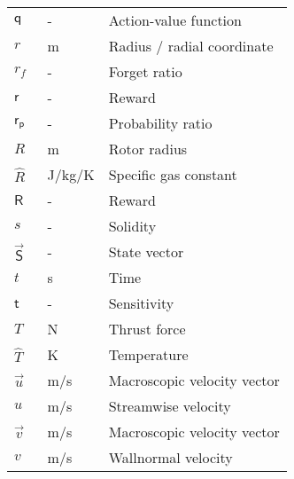 \begin{longtable}{p{5cm}p{4cm}p{5cm}}
    $\mathsf{q}$			& \SI{}{-}		& Action-value function \\
    $r$						& \SI{}{m}		& Radius / radial coordinate \\
    $r_f$					& \SI{}{-}		& Forget ratio \\
    $\mathsf{r}$			& \SI{}{-}		& Reward \\	
    $\mathsf{r_p}$			& \SI{}{-}		& Probability ratio \\
    $R$						& \SI{}{m}		& Rotor radius \\
    $\hat{R}$               & \SI{}{J/kg/K} & Specific gas constant \\ 
    $\mathsf{R}$			& \SI{}{-}		& Reward \\	
    $s$						& \SI{}{-}		& Solidity \\
    $\vec{\mathsf{S}}$		& \SI{}{-}		& State vector \\
    $t$                     & \SI{}{s}      & Time  \\
    $\mathsf{t}$			& \SI{}{-}		& Sensitivity \\
    $T$                     & \SI{}{N}      & Thrust force \\
    $\hat{T}$				& \SI{}{K}		& Temperature \\
    $\vec{u}$               & \SI{}{m/s}    & Macroscopic velocity vector \\
    $u$                     & \SI{}{m/s}    & Streamwise velocity \\
    $\vec{v}$               & \SI{}{m/s}    & Macroscopic velocity vector \\
    $v$                     & \SI{}{m/s}    & Wallnormal velocity \\    

\end{longtable}
